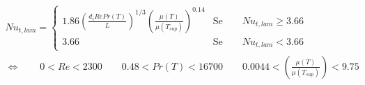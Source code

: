 \documentclass[a4paper,10pt]{article}                                                                                       %
\begin{document}
\begin{equation}                                                                                                            %
  \begin{aligned}                                                                                                           %
  \label{eqn:nu_pipe_l}                                                                                                     %
  Nu_{t,lam} = \begin{cases}1.86\left(\frac{d_iRePr(T)}{L}\right)^{1/3}                                                     %
  \left(\frac{\mu(T)}{\mu(T_{sup})}\right)^{0.14}&\text{Se}\qquad Nu_{t,lam}\ge3.66\qquad\qquad\\                           %
  3.66&\text{Se}\qquad Nu_{t,lam}<3.66\end{cases}                                                                           %
  \\\Leftrightarrow\qquad                                                                                                   %
  0<Re<2300\qquad0.48<Pr(T)<16700\qquad0.0044<\left(\frac{\mu(T)}{\mu(T_{sup})}\right)<9.75                                 %
  \end{aligned}                                                                                                             %
\end{equation}                                                                                                              %
\vspace{3mm}                                                                                                                %
\end{document}
